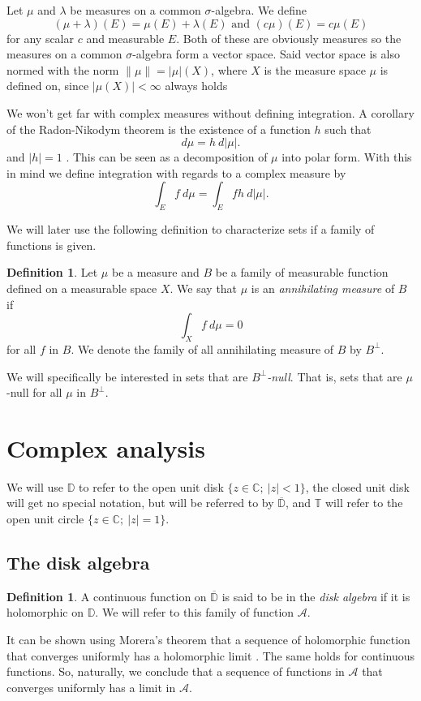 \documentclass[a4paper,12pt,twoside,BCOR=10mm]{scrbook}
\theoremstyle{definition}
\theoremstyle{definition}
\theoremstyle{definition}
\newtheorem{definition}[theorem]{Definition}
\begin{document}
Let $\mu$ and $\lambda$ be measures on a common $\sigma$-algebra.
We define
\[
	(\mu + \lambda)(E) = \mu(E) + \lambda(E) \text{ and } (c\mu)(E) = c\mu(E)
\]
for any scalar $c$ and measurable $E$.
Both of these are obviously measures so the measures on a common $\sigma$-algebra form a vector space.
Said vector space is also normed with the norm \label{index3} $\|\mu\| = |\mu|(X)$, where $X$ is the measure space $\mu$ is defined on, since $|\mu(X)| < \infty$ always holds \citep[Theorem $6.4$]{rudin2}

We won't get far with complex measures without defining integration.
A corollary of the Radon-Nikodym theorem is the existence of a function $h$ such that
\[
	d\mu = h\ d|\mu|.
\]
and $|h| = 1$ \citep[Theroem $6.12$]{rudin2}.
This can be seen as a decomposition of $\mu$ into polar form.
With this in mind we define integration with regards to a complex measure by
\[
	\int_E f\ d\mu = \int_E fh\ d|\mu|.
\]

We will later use the following definition to characterize sets if a family of functions is given.
\begin{definition}
\label{annilatingmeasure}
Let $\mu$ be a measure and $B$ be a family of measurable function defined on a measurable space $X$.
We say that $\mu$ is an \emph{annihilating measure} of $B$ if
\[
	\int_X f\ d\mu = 0
\]
for all $f$ in $B$. We denote the family of all annihilating measure of $B$ by $B^{\bot}$.
\end{definition}
We will specifically be interested in sets that are \emph{$B^{\bot}$-null}.
That is, sets that are $\mu$-null for all $\mu$ in $B^{\bot}$. 
\section{Complex analysis}
\label{index5}
We will use $\mathbb{D}$ to refer to the open unit disk $\{z \in \mathbb{C};\ |z| < 1\}$,
	the closed unit disk will get no special notation, but will be referred to by $\overline{\mathbb{D}}$,
	and $\mathbb{T}$ will refer to the open unit circle $\{z \in \mathbb{C};\ |z| = 1\}$.
\subsection{The disk algebra}
\begin{definition}
\label{index4}
A continuous function on $\overline{\mathbb{D}}$ is said to be in the \emph{disk algebra} if it is holomorphic on $\mathbb{D}$.
We will refer to this family of function $\mathcal{A}$.
\end{definition}
It can be shown using Morera's theorem that a sequence of holomorphic function that converges uniformly has a holomorphic limit \citep{reynir}.
The same holds for continuous functions.
So, naturally, we conclude that a sequence of functions in $\mathcal{A}$ that converges uniformly has a limit in $\mathcal{A}$.
\end{document}
